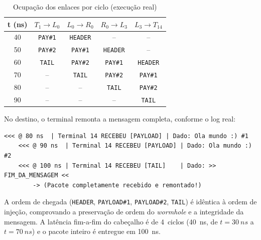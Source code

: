 \documentclass[conference]{IEEEtran}
\begin{document}
\begin{table}[!t]
\caption{Ocupação dos enlaces por ciclo (execução real)}
\label{tab:pipeline}
\centering
\renewcommand{\arraystretch}{1.15}
\footnotesize
\begin{tabular}{@{}c|cccc@{}}
\toprule
\textbf{t (ns)} & $T_1\!\to\!L_0$ & $L_0\!\to\!R_0$ & $R_0\!\to\!L_3$ & $L_3\!\to\!T_{14}$ \\
\midrule
40  & \texttt{PAY\#1} & \texttt{HEADER} & --              & --              \\
50  & \texttt{PAY\#2} & \texttt{PAY\#1} & \texttt{HEADER} & --              \\
60  & \texttt{TAIL}   & \texttt{PAY\#2} & \texttt{PAY\#1} & \texttt{HEADER} \\
70  & --              & \texttt{TAIL}   & \texttt{PAY\#2} & \texttt{PAY\#1} \\
80  & --              & --              & \texttt{TAIL}   & \texttt{PAY\#2} \\
90  & --              & --              & --              & \texttt{TAIL}   \\
\bottomrule
\end{tabular}
\end{table}

No destino, o terminal remonta a mensagem completa, conforme o log real:

\noindent\begin{minipage}{\columnwidth}
\begin{lstlisting}[style=log]
    <<< @ 80 ns  | Terminal 14 RECEBEU [PAYLOAD] | Dado: Ola mundo :) #1
    <<< @ 90 ns  | Terminal 14 RECEBEU [PAYLOAD] | Dado: Ola mundo :) #2
    <<< @ 100 ns | Terminal 14 RECEBEU [TAIL]    | Dado: >> FIM_DA_MENSAGEM <<
        -> (Pacote completamente recebido e remontado!)
\end{lstlisting}
\end{minipage}

A ordem de chegada (\texttt{HEADER}, \texttt{PAYLOAD\#1}, \texttt{PAYLOAD\#2},
\texttt{TAIL}) é idêntica à ordem de injeção, comprovando a preservação de ordem
do \emph{wormhole} e a integridade da mensagem. A latência fim-a-fim do
cabeçalho é de 4~ciclos (\SI{40}{ns}, de $t=\SI{30}{ns}$ a $t=\SI{70}{ns}$) e o
pacote inteiro é entregue em \SI{100}{ns}.
\end{document}

